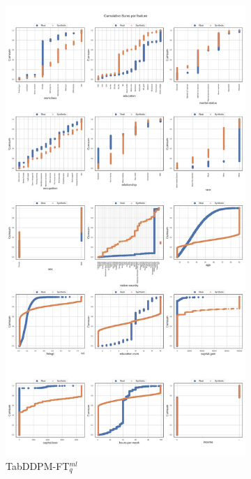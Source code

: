 \begin{landscape}
\begin{figure}[h]
		\hfill
		\begin{subfigure}{0.3\linewidth}
			\includegraphics[height=\textheight,width=\linewidth,keepaspectratio]{images/cumsums/tab-ddpm-ft.jpg}
			\caption{TabDDPM-FT$^{ml}_q$}
		\end{subfigure}
		\hfill
		\begin{subfigure}{0.3\linewidth}

\end{subfigure}
\end{figure}
\end{landscape}
